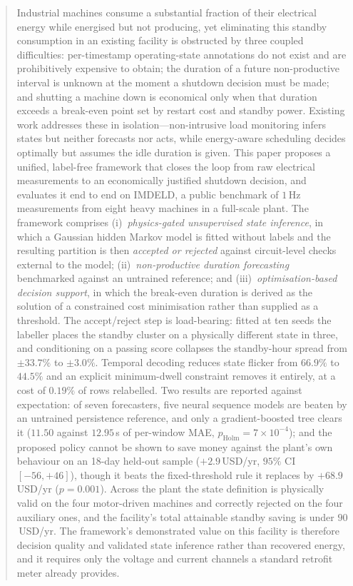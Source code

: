 \begin{abstract}
Industrial machines consume a substantial fraction of their electrical
energy while energised but not producing, yet eliminating this standby
consumption in an existing facility is obstructed by three coupled
difficulties: per-timestamp operating-state annotations do not exist and
are prohibitively expensive to obtain; the duration of a future
non-productive interval is unknown at the moment a shutdown decision must
be made; and shutting a machine down is economical only when that
duration exceeds a break-even point set by restart cost and standby
power. Existing work addresses these in isolation---non-intrusive load
monitoring infers states but neither forecasts nor acts, while
energy-aware scheduling decides optimally but assumes the idle duration
is given. This paper proposes a unified, label-free framework that closes
the loop from raw electrical measurements to an economically justified
shutdown decision, and evaluates it end to end on IMDELD, a public
benchmark of $1$\,Hz measurements from eight heavy machines in a
full-scale plant. The framework comprises (i)~\emph{physics-gated
unsupervised state inference}, in which a Gaussian hidden Markov model is
fitted without labels and the resulting partition is then \emph{accepted
or rejected} against circuit-level checks external to the model;
(ii)~\emph{non-productive duration forecasting} benchmarked against an
untrained reference; and (iii)~\emph{optimisation-based decision
support}, in which the break-even duration is derived as the solution of
a constrained cost minimisation rather than supplied as a threshold. The
accept/reject step is load-bearing: fitted at ten seeds the labeller
places the standby cluster on a physically different state in three, and
conditioning on a passing score collapses the standby-hour spread from
$\pm33.7\%$ to $\pm3.0\%$. Temporal decoding reduces state flicker from
$66.9\%$ to $44.5\%$ and an explicit minimum-dwell constraint removes it
entirely, at a cost of $0.19\%$ of rows relabelled. Two results are
reported against expectation: of seven forecasters, five neural sequence
models are beaten by an untrained persistence reference, and only a
gradient-boosted tree clears it ($11.50$ against $12.95$\,s of
per-window MAE, $p_{\text{Holm}}=7\times10^{-4}$); and the proposed
policy cannot be shown to save money against the plant's own behaviour on
an 18-day held-out sample ($+2.9$\,USD/yr, $95\%$ CI $[-56,+46]$), though
it beats the fixed-threshold rule it replaces by $+68.9$\,USD/yr
($p=0.001$). Across the plant the state definition is physically valid on
the four motor-driven machines and correctly rejected on the four
auxiliary ones, and the facility's total attainable standby saving is
under $90$\,USD/yr. The framework's demonstrated value on this facility
is therefore decision quality and validated state inference rather than
recovered energy, and it requires only the voltage and current channels a
standard retrofit meter already provides.
\end{abstract}
